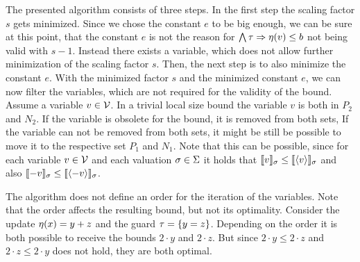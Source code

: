 The presented algorithm consists of three steps.
In the first step the scaling factor $s$ gets minimized.
Since we chose the constant $e$ to be big enough, we can be sure at this point, that the constant $e$ is not the reason for $\bigwedge \tau \Rightarrow \eta(v) \leq b$ not being valid with $s-1$.
Instead there exists a variable, which does not allow further minimization of the scaling factor $s$.
Then, the next step is to also minimize the constant $e$.
With the minimized factor $s$ and the minimized constant $e$, we can now filter the variables, which are not required for the validity of the bound.
Assume a variable $v \in \mathcal{V}$.
In a trivial local size bound the variable $v$ is both in $P_2$ and $N_2$.
If the variable is obsolete for the bound, it is removed from both sets, 
If the variable can not be removed from both sets, it might be still be possible to move it to the respective set $P_1$ and $N_1$.
Note that this can be possible, since for each variable $v \in \mathcal{V}$ and each valuation $\sigma \in \Sigma$ it holds that $\llbracket v \rrbracket_{\sigma} \leq \llbracket \langle v\rangle \rrbracket_{\sigma}$ and also $\llbracket -v \rrbracket_{\sigma} \leq \llbracket \langle-v\rangle \rrbracket_{\sigma}$.

The algorithm does not define an order for the iteration of the variables.
Note that the order affects the resulting bound, but not its optimality.
Consider the update $\eta(x) = y + z$ and the guard $\tau = \lbrace y = z \rbrace$.
Depending on the order it is both possible to receive the bounds $2 \cdot y$ and $2 \cdot z$.
But since $2 \cdot y \leq 2 \cdot z$ and $2 \cdot z \leq 2 \cdot y$ does not hold, they are both optimal.

